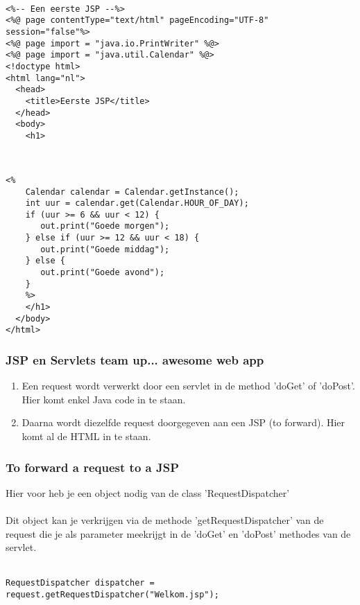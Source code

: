 \documentclass{beamer}
\begin{document}
\begin{frame}[fragile]

\begin{verbatim}

<%-- Een eerste JSP --%>
<%@ page contentType="text/html" pageEncoding="UTF-8" 
session="false"%>
<%@ page import = "java.io.PrintWriter" %@>
<%@ page import = "java.util.Calendar" %@>
<!doctype html>
<html lang="nl">
  <head>
    <title>Eerste JSP</title>
  </head>
  <body>
    <h1>
    
\end{verbatim}

\end{frame}


\begin{frame}[fragile]

\begin{verbatim}

<%
    Calendar calendar = Calendar.getInstance();
    int uur = calendar.get(Calendar.HOUR_OF_DAY);
    if (uur >= 6 && uur < 12) {
       out.print("Goede morgen");
    } else if (uur >= 12 && uur < 18) {
       out.print("Goede middag");
    } else {
       out.print("Goede avond");
    }
    %>
    </h1>
  </body>
</html>

\end{verbatim}

\end{frame}


\begin{frame}

\frametitle {JSP en Servlets team up... awesome web app}

{\Large \begin{enumerate}
  \item Een request wordt verwerkt door een servlet in de method 'doGet' of 'doPost'. Hier komt enkel Java code in te staan.
  \item Daarna wordt diezelfde request doorgegeven aan een JSP (to forward). Hier komt al de HTML in te staan.
\end{enumerate}}

\end{frame}


\begin{frame}[fragile]

\frametitle {To forward a request to a JSP}

{\Large Hier voor heb je een object nodig van de class 'RequestDispatcher'\\~\\
Dit object kan je verkrijgen via de methode 'getRequestDispatcher' van de request die je als parameter meekrijgt in de 'doGet' en 'doPost' methodes van de servlet.\\~\\
\begin{verbatim}RequestDispatcher dispatcher = 
request.getRequestDispatcher("Welkom.jsp"); \end{verbatim}
}

\end{frame}
\end{document}
